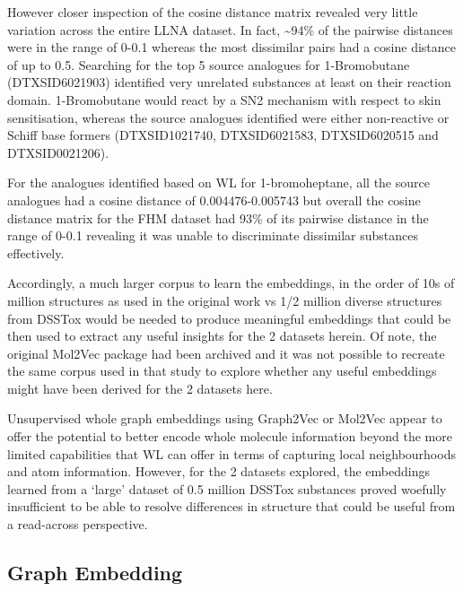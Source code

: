 \documentclass[
  super,
  preprint,
  3p]{elsarticle}
\begin{document}
However closer inspection of the cosine distance matrix revealed very
little variation across the entire LLNA dataset. In fact,
\textasciitilde94\% of the pairwise distances were in the range of 0-0.1
whereas the most dissimilar pairs had a cosine distance of up to 0.5.
Searching for the top 5 source analogues for 1-Bromobutane
(DTXSID6021903) identified very unrelated substances at least on their
reaction domain. 1-Bromobutane would react by a SN2 mechanism with
respect to skin sensitisation, whereas the source analogues identified
were either non-reactive or Schiff base formers (DTXSID1021740,
DTXSID6021583, DTXSID6020515 and DTXSID0021206).

For the analogues identified based on WL for 1-bromoheptane, all the
source analogues had a cosine distance of 0.004476-0.005743 but overall
the cosine distance matrix for the FHM dataset had 93\% of its pairwise
distance in the range of 0-0.1 revealing it was unable to discriminate
dissimilar substances effectively.

Accordingly, a much larger corpus to learn the embeddings, in the order
of 10s of million structures as used in the original work vs 1/2 million
diverse structures from DSSTox would be needed to produce meaningful
embeddings that could be then used to extract any useful insights for
the 2 datasets herein. Of note, the original Mol2Vec package had been
archived and it was not possible to recreate the same corpus used in
that study to explore whether any useful embeddings might have been
derived for the 2 datasets here.

Unsupervised whole graph embeddings using Graph2Vec or Mol2Vec appear to
offer the potential to better encode whole molecule information beyond
the more limited capabilities that WL can offer in terms of capturing
local neighbourhoods and atom information. However, for the 2 datasets
explored, the embeddings learned from a `large' dataset of 0.5 million
DSSTox substances proved woefully insufficient to be able to resolve
differences in structure that could be useful from a read-across
perspective.

\subsection{Graph Embedding}\label{sec-graph2vec}
\end{document}
